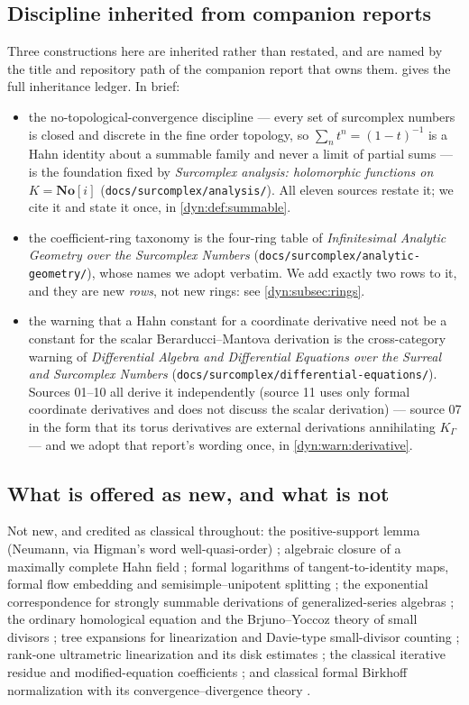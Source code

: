 \documentclass[11pt,letterpaper]{article}
\theoremstyle{definition}
\theoremstyle{remark}
\newcommand{\No}{\mathbf{No}}
\numberwithin{equation}{section}
\begin{document}
\subsection{Discipline inherited from companion reports}
Three constructions here are inherited rather than restated, and are named
by the title and repository path of the companion report that owns them.
 gives the full inheritance ledger. In brief:
\begin{itemize}
\item the no-topological-convergence discipline --- every set of surcomplex
numbers is closed and discrete in the fine order topology, so
$\sum_{n}t^{n}=(1-t)^{-1}$ is a Hahn identity about a summable family and
never a limit of partial sums --- is the foundation fixed by
\emph{Surcomplex analysis: holomorphic functions on $K=\No[i]$}
(\texttt{docs/surcomplex/analysis/}). All eleven sources restate it; we cite
it and state it once, in \cref{dyn:def:summable}.
\item the coefficient-ring taxonomy is the four-ring table of
\emph{Infinitesimal Analytic Geometry over the Surcomplex Numbers}
(\texttt{docs/surcomplex/analytic-geometry/}), whose names we adopt
verbatim. We add exactly two rows to it, and they are new \emph{rows},
not new rings: see \cref{dyn:subsec:rings}.
\item the warning that a Hahn constant for a coordinate derivative need not
be a constant for the scalar Berarducci--Mantova derivation is the
cross-category warning of \emph{Differential Algebra and Differential
Equations over the Surreal and Surcomplex Numbers}
(\texttt{docs/surcomplex/differential-equations/}). Sources 01--10 all
derive it independently (source 11 uses only formal coordinate derivatives
and does not discuss the scalar derivation) --- source 07 in the form that its torus
derivatives are external derivations annihilating $K_\Gamma$ --- and we
adopt that report's wording once, in \cref{dyn:warn:derivative}.
\end{itemize}

\subsection{What is offered as new, and what is not}
Not new, and credited as classical throughout: the positive-support lemma
(Neumann, via Higman's word well-quasi-order) \cite{Neumann,Higman};
algebraic closure of a maximally complete Hahn field \cite{Poonen}; formal
logarithms of tangent-to-identity maps, formal flow embedding and
semisimple--unipotent splitting \cite{Ribon,GV}; the exponential
correspondence for strongly summable derivations of generalized-series
algebras \cite{BKKPS}; the ordinary homological equation and the
Brjuno--Yoccoz theory of small divisors
\cite{CarlettiMarmi,Yoccoz,BuffCheritat,Marmi}; tree expansions for
linearization and Davie-type small-divisor counting
\cite{FauvetMenousSauzin,FMS26,Marmi}; rank-one ultrametric
linearization and its disk estimates \cite{Lindahl,LindahlPadic}; the
classical iterative residue and modified-equation coefficients
\cite{Hairer,AB}; and classical formal Birkhoff normalization with its
convergence--divergence theory \cite{PerezMarco,Krikorian}.
\end{document}
